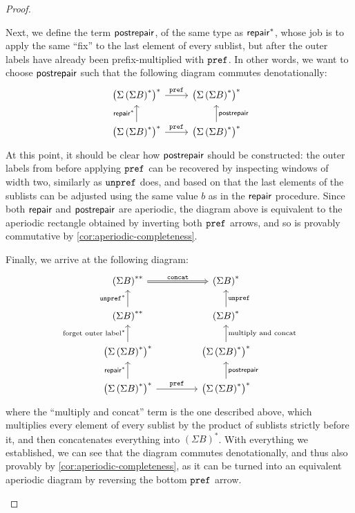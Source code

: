 \begin{proof}
\begin{description}
        Next, we define the term $\mathsf{postrepair}$, of the same type as $\mathsf{repair}^*$, whose job is to apply the same ``fix'' to the last element of every sublist, but after the outer labels have already been prefix-multiplied with $\mathtt{pref}$. In other words, we want to choose $\mathsf{postrepair}$ such that the following diagram commutes denotationally:
        \[
        \begin{tikzcd}
            \left( \Sigma \left( \Sigma B \right)^* \right)^*
            \ar[r, "\prefterm"]
            &\left( \Sigma \left( \Sigma B \right)^* \right)^*
            \\ 
            \left( \Sigma \left( \Sigma B \right)^* \right)^*
            \ar[u, "{\repairterm^*}"]
            \ar[r, "\prefterm"]
            &\left( \Sigma \left( \Sigma B \right)^* \right)^*
            \ar[u, "\postrepairterm"']
        \end{tikzcd}
        \]
        At this point, it should be clear how $\mathsf{postrepair}$ should be constructed: the outer labels from before applying $\mathtt{pref}$ can be recovered by inspecting windows of width two, similarly as $\mathtt{unpref}$ does, and based on that the last elements of the sublists can be adjusted using the same value $b$ as in the $\mathsf{repair}$ procedure. Since both $\mathsf{repair}$ and $\mathsf{postrepair}$ are aperiodic, the diagram above is equivalent to the aperiodic rectangle obtained by inverting both $\mathtt{pref}$ arrows, and so is provably commutative by \cref{cor:aperiodic-completeness}.

        Finally, we arrive at the following diagram:
        \[
        \begin{tikzcd}[column sep=1.5cm]
            \left( \Sigma B \right)^{**}
            \ar[r, \dropar, "\concatterm"]
            &
            \left( \Sigma B \right)^*
            \\ 
            \left( \Sigma B \right)^{**}
            \ar[u, "{\unprefterm^*}"]
            &\left( \Sigma B \right)^*
            \ar[u, "\unprefterm"']
            \\ 
            \left( \Sigma \left( \Sigma B \right)^* \right)^*
            \ar[u, "\text{forget outer label}^*"]
            &\left( \Sigma \left( \Sigma B \right)^* \right)^*
            \ar[u, "\text{multiply and concat}"']
            \\ 
            \left( \Sigma \left( \Sigma B \right)^* \right)^*
            \ar[u, "{\repairterm^*}"]
            \ar[r, "\prefterm"]
            &\left( \Sigma \left( \Sigma B \right)^* \right)^*
            \ar[u, "\postrepairterm"']
        \end{tikzcd}
        \]
        where the ``multiply and concat'' term is the one described above, which multiplies every element of every sublist by the product of sublists strictly before it, and then concatenates everything into $(\Sigma B)^*$. With everything we established, we can see that the diagram commutes denotationally, and thus also provably by \cref{cor:aperiodic-completeness}, as it can be turned into an equivalent aperiodic diagram by reversing the bottom $\mathtt{pref}$ arrow. 
        

\end{description}
\end{proof}
